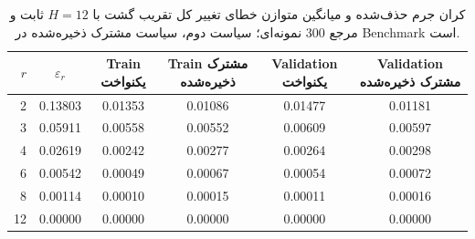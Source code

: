 \begin{table}[htbp]
\centering\small
\caption{کران جرم حذف‌شده و میانگین متوازن خطای تغییر کل تقریب گشت با $H=12$ ثابت و مرجع $300$ نمونه‌ای؛ سیاست دوم، سیاست مشترک ذخیره‌شده در Benchmark است.}
\label{tab:ch4-matrix-truncation}
\begin{tabular}{rccccc}\hline
$r$ & $\varepsilon_r$ & Train یکنواخت & Train مشترک ذخیره‌شده & Validation یکنواخت & Validation مشترک ذخیره‌شده\\\hline
2 & 0.13803 & 0.01353 & 0.01086 & 0.01477 & 0.01181\\
3 & 0.05911 & 0.00558 & 0.00552 & 0.00609 & 0.00597\\
4 & 0.02619 & 0.00242 & 0.00277 & 0.00264 & 0.00298\\
6 & 0.00542 & 0.00049 & 0.00067 & 0.00054 & 0.00072\\
8 & 0.00114 & 0.00010 & 0.00015 & 0.00011 & 0.00016\\
12 & 0.00000 & 0.00000 & 0.00000 & 0.00000 & 0.00000\\
\hline
\end{tabular}
\end{table}
